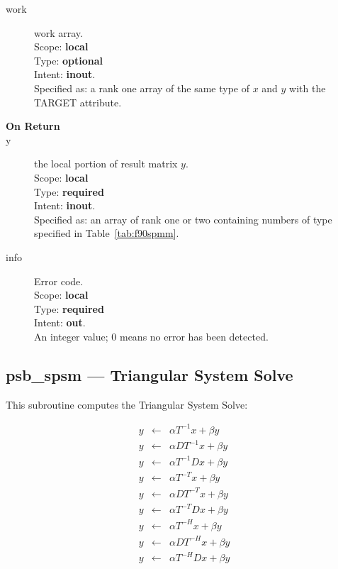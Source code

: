 \begin{description}
\item[work]  work array.\\
Scope: {\bf local} \\
Type: {\bf optional}\\
Intent: {\bf inout}.\\
Specified as: a rank one array of the same type of $x$ and $y$ with
the TARGET attribute.

\item[\bf On Return]
\item[y] the local portion of result matrix $y$.\\
Scope: {\bf local} \\
Type: {\bf required} \\
Intent: {\bf inout}.\\
Specified as: an array of rank one or two
containing numbers of type specified in
Table~\ref{tab:f90spmm}.
\item[info] Error code.\\
Scope: {\bf local} \\
Type: {\bf required} \\
Intent: {\bf out}.\\
An integer value; 0 means no error has been detected.
\end{description}

%
%


\clearpage\subsection{psb\_spsm --- Triangular System Solve}

This subroutine computes the Triangular System Solve:

\begin{eqnarray*}
y &\leftarrow& \alpha  T^{-1}  x + \beta y\\
y &\leftarrow& \alpha D  T^{-1}  x + \beta y\\
y &\leftarrow& \alpha  T^{-1}  D x + \beta y\\
y &\leftarrow& \alpha  T^{-T}  x + \beta y\\
y &\leftarrow& \alpha D  T^{-T}  x + \beta y\\
y &\leftarrow& \alpha  T^{-T}  D x + \beta y\\
y &\leftarrow& \alpha  T^{-H}  x + \beta y\\
y &\leftarrow& \alpha D  T^{-H}  x + \beta y\\
y &\leftarrow& \alpha  T^{-H}  D x + \beta y\\
\end{eqnarray*}


